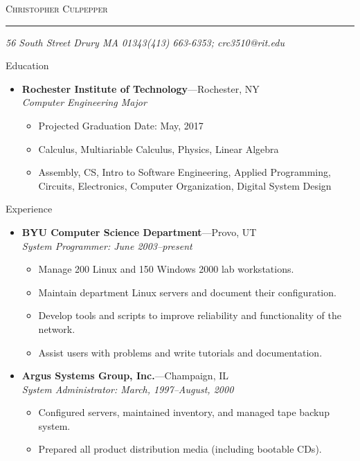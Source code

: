 \documentclass[11pt,oneside]{article}
\makeatletter
\newcommand{\name}{Christopher Culpepper}
\newcommand{\addr}{56 South Street Drury MA 01343}
\newcommand{\phone}{(413) 663-6353}
\newcommand{\email}{crc3510@rit.edu}
\newcommand{\bigname}[1]{
	\begin{center}\fontfamily{phv}\selectfont\Huge\scshape#1\end{center}
}
\newenvironment{ressection}[1]{
	\vspace{4pt}
	{\fontfamily{phv}\selectfont\Large#1}
	\begin{itemize}
	\vspace{3pt}
}{
	\end{itemize}
}
\newcommand{\ressubitem}[1]{
	\vspace{-1pt}
	\item \begin{flushleft} #1 \end{flushleft}
}
\newcommand{\resbigitem}[3]{
	\vspace{-5pt}
	\item
	\textbf{#1}---#2 \\
	\textit{#3}
}
\newenvironment{ressubsec}[3]{
	\resbigitem{#1}{#2}{#3}
	\vspace{-2pt}
	\begin{itemize}
}{
	\end{itemize}
}
\makeatother
\begin{document}
 \selectfont

\bigname{\name}

\vspace{-8pt} \rule{\textwidth}{1pt}

\vspace{-1pt} {\small\itshape \addr \hfill \phone; \email}

\vspace{8 pt}




\begin{ressection}{Education}

	\begin{ressubsec}{Rochester Institute of Technology}{Rochester, NY}{Computer Engineering Major}
		\ressubitem{Projected Graduation Date: May, 2017}
		\ressubitem{Calculus, Multiariable Calculus, Physics, Linear Algebra}
		\ressubitem{Assembly, CS, Intro to Software Engineering, Applied Programming, Circuits, Electronics, Computer Organization, Digital System Design}
	\end{ressubsec}

\end{ressection}


\begin{ressection}{Experience}

	\begin{ressubsec}{BYU Computer Science Department}{Provo, UT}{System Programmer: June 2003--present}
		\ressubitem{Manage 200 Linux and 150 Windows 2000 lab workstations.}
		\ressubitem{Maintain department Linux servers and document their configuration.}
		\ressubitem{Develop tools and scripts to improve reliability and functionality of the network.}
		\ressubitem{Assist users with problems and write tutorials and documentation.}
	\end{ressubsec}

	\begin{ressubsec}{Argus Systems Group, Inc.}{Champaign, IL}{System Administrator: March, 1997--August, 2000}
		\ressubitem{Configured servers, maintained inventory, and managed tape backup system.}
		\ressubitem{Prepared all product distribution media (including bootable CDs).}
	\end{ressubsec}

\end{ressection}
\end{document}
